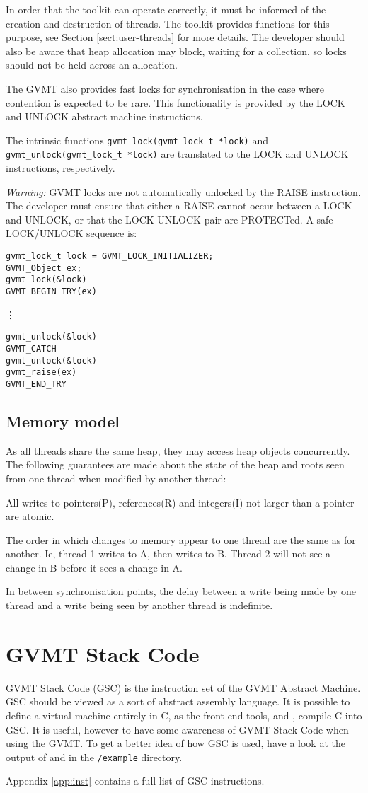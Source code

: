 In order that the toolkit can operate correctly, it must be informed of the creation and destruction of threads.
The toolkit provides functions for this purpose, see Section \ref{sect:user-threads} for more details.
The developer should also be aware that heap allocation may block, waiting for a collection, so locks should not be held across an allocation.

The GVMT also provides fast locks for synchronisation in the case where contention is expected to be rare. This functionality is provided by the  LOCK and UNLOCK abstract machine instructions. 

The intrinsic functions \verb|gvmt_lock(gvmt_lock_t *lock)| and \verb|gvmt_unlock(gvmt_lock_t *lock)| are translated to the LOCK and UNLOCK instructions, respectively.

\emph{Warning:} GVMT locks are not automatically unlocked by the RAISE instruction. The developer must ensure that either a RAISE cannot occur between a LOCK and UNLOCK, or that the LOCK UNLOCK pair are PROTECTed. A safe LOCK/UNLOCK sequence is:
\begin{verbatim}
gvmt_lock_t lock = GVMT_LOCK_INITIALIZER;
GVMT_Object ex;
gvmt_lock(&lock)
GVMT_BEGIN_TRY(ex)
\end{verbatim}
\nopagebreak[4]
        \vdots
\nopagebreak[4]
\begin{verbatim}
gvmt_unlock(&lock)
GVMT_CATCH
gvmt_unlock(&lock)
gvmt_raise(ex)
GVMT_END_TRY
\end{verbatim}

\subsection{Memory model}
As all threads share the same heap, they may access heap objects concurrently. The following guarantees are made about the state of the heap and roots seen from one thread when modified by another thread:

All writes to pointers(P), references(R) and integers(I) not larger than a pointer are atomic.


The order in which changes to memory appear to one thread are the same as for another. Ie, thread 1 writes to A, then writes to B. Thread 2 will not see a change in B before it sees a change in A.


In between synchronisation points, the delay between a write being made by one thread and a write being seen by another thread is indefinite.

\section{GVMT Stack Code}
GVMT Stack Code (GSC) is the instruction set of the GVMT Abstract Machine.
GSC should be viewed as a sort of abstract assembly language. It is possible to define a virtual machine entirely in C, as the front-end tools, \gvmtic{} and \gvmtc, compile C into GSC.
It is useful, however to have some awareness of GVMT Stack Code when using the GVMT.
To get a better idea of how GSC is used, have a look at the output of \gvmtc and \gvmtic in the \verb|/example| directory.

Appendix \ref{app:inst} contains a full list of GSC instructions.
